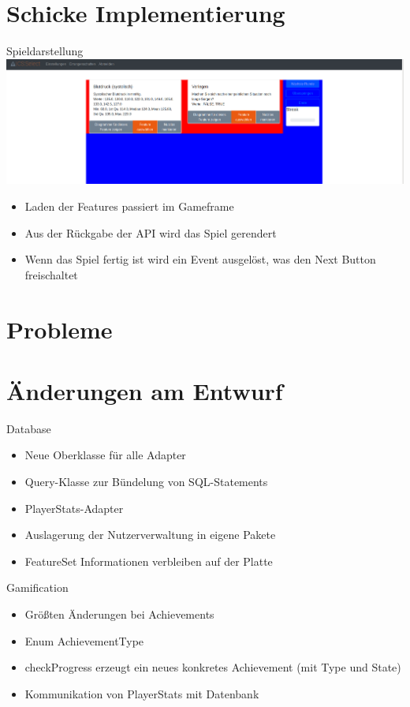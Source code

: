 \documentclass[xcolor=dvipsnames]{beamer}
\begin{document}
\section{Schicke Implementierung}
\begin{frame}{Spieldarstellung}
\includegraphics[width=\textwidth]{../img/gameframe.png}
\begin{itemize}
    \item Laden der Features passiert im Gameframe
    \item Aus der Rückgabe der API wird das Spiel gerendert
    \item Wenn das Spiel fertig ist wird ein Event ausgelöst, was den Next Button freischaltet
\end{itemize}
\end{frame}

\section{Probleme}

\section{Änderungen am Entwurf}
\begin{frame}{Database}
    \begin{itemize}
        \item Neue Oberklasse für alle Adapter
        \item Query-Klasse zur Bündelung von SQL-Statements
        \item PlayerStats-Adapter
        \item Auslagerung der Nutzerverwaltung in eigene Pakete
        \item FeatureSet Informationen verbleiben auf der Platte
    \end{itemize}
\end{frame}

\begin{frame}{Gamification}
  \begin{itemize}
     \item Größten Änderungen bei Achievements
     \item Enum AchievementType
     \item checkProgress erzeugt ein neues konkretes Achievement (mit Type und State)
     \item Kommunikation von PlayerStats mit Datenbank
  \end{itemize}
\end{frame}
\end{document}
